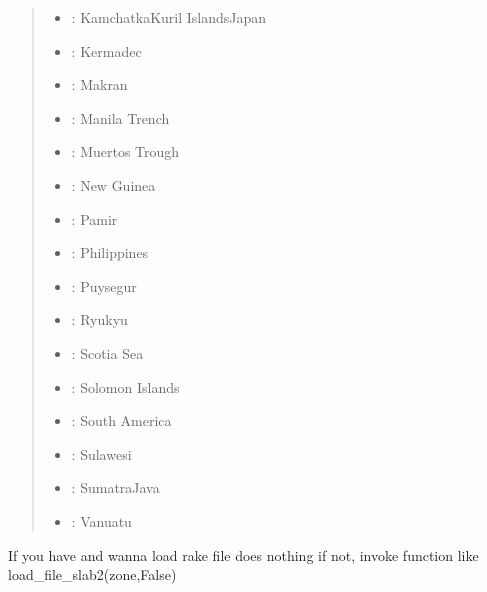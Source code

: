 \documentclass[letterpaper,10pt,english]{sphinxmanual}
\begin{document}
\begin{fulllineitems}
\begin{quote}
\begin{itemize}
\item {} 
\sphinxAtStartPar
{}: Kamchatka\sphinxhyphen{}Kuril Islands\sphinxhyphen{}Japan

\item {} 
\sphinxAtStartPar
{}: Kermadec

\item {} 
\sphinxAtStartPar
{}: Makran

\item {} 
\sphinxAtStartPar
{}: Manila Trench

\item {} 
\sphinxAtStartPar
{}: Muertos Trough

\item {} 
\sphinxAtStartPar
{}: New Guinea

\item {} 
\sphinxAtStartPar
{}: Pamir

\item {} 
\sphinxAtStartPar
{}: Philippines

\item {} 
\sphinxAtStartPar
{}: Puysegur

\item {} 
\sphinxAtStartPar
{}: Ryukyu

\item {} 
\sphinxAtStartPar
{}: Scotia Sea

\item {} 
\sphinxAtStartPar
{}: Solomon Islands

\item {} 
\sphinxAtStartPar
{}: South America

\item {} 
\sphinxAtStartPar
{}: Sulawesi

\item {} 
\sphinxAtStartPar
{}: Sumatra\sphinxhyphen{}Java

\item {} 
\sphinxAtStartPar
{}: Vanuatu

\end{itemize}
\end{quote}

\sphinxAtStartPar
If you have and wanna load rake file does nothing
if not, invoke function like load\_file\_slab2(zone,False)

\end{fulllineitems}
\end{document}
